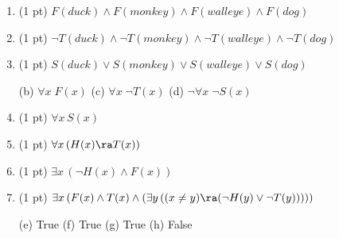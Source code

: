 \begin{questions}
\begin{enumerate}[label=(\alph*)]
  \item (1 pt)  \hspace*{0.15in}$F(duck) \wedge F(monkey) \wedge F(walleye) \wedge F(dog)$
  \item (1 pt)  \hspace*{0.15in}$\neg T(duck) \wedge \neg T(monkey) \wedge \neg T(walleye) \wedge \neg T(dog) $
  \item (1 pt)  \hspace*{0.15in}$S(duck) \vee S(monkey) \vee S(walleye) \vee S(dog)$
      \begin{solution}
        (b) $\forall x\; F(x)$
        \hspace*{0.5in} (c) $\forall x\; \neg T(x)$
        \hspace*{0.5in} (d) $\neg \forall x\; \neg S(x)$ 
      \end{solution}

  \item (1 pt) \hspace*{0.15in}  $\forall x\, S(x)$ 
  \item (1 pt) \hspace*{0.15in} $\forall x\, (H(x) \ra T(x))$
  \item (1 pt) \hspace*{0.15in} $\exists x\, (\neg H(x) \wedge F(x)) $
  \item (1 pt) \hspace*{0.15in} $\exists x\, (F(x) \wedge T(x) \wedge (\exists y\, ((x \neq y)  \ra (\neg H(y) \vee \neg T(y)))))$
    \begin{solution}
      (e) True 
      \hspace*{0.15in} (f) True 
      \hspace*{0.15in} (g) True
      \hspace*{0.15in} (h) False
    \end{solution}

\end{enumerate}


\end{questions}
